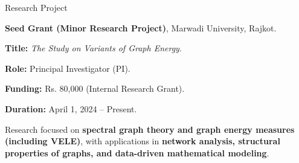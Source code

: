 \begin{rubric}{Research Project}

\entry*[2024 -- Present]%
\textbf{Seed Grant (Minor Research Project)}, Marwadi University, Rajkot.\par
\textbf{Title:} \emph{The Study on Variants of Graph Energy}.\par
\textbf{Role:} Principal Investigator (PI).\par
\textbf{Funding:} Rs. 80,000 (Internal Research Grant).\par
\textbf{Duration:} April 1, 2024 -- Present.\par
Research focused on \textbf{spectral graph theory and graph energy measures (including VELE)}, with applications in \textbf{network analysis, structural properties of graphs, and data-driven mathematical modeling}.

\end{rubric}
